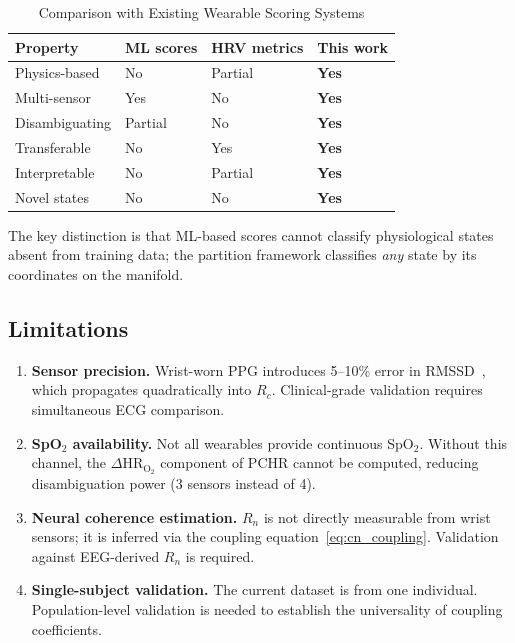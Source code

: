 \documentclass[10pt,twocolumn,a4paper]{article}
\theoremstyle{definition}
\newcommand{\Rc}{R_c}
\newcommand{\Rn}{R_n}
\begin{document}
\begin{table}[H]
\centering
\caption{Comparison with Existing Wearable Scoring Systems}
\label{tab:comparison}
\begin{tabular}{llll}
\toprule
\textbf{Property} & \textbf{ML scores} & \textbf{HRV metrics} & \textbf{This work}\\
\midrule
Physics-based & No & Partial & \textbf{Yes}\\
Multi-sensor & Yes & No & \textbf{Yes}\\
Disambiguating & Partial & No & \textbf{Yes}\\
Transferable & No & Yes & \textbf{Yes}\\
Interpretable & No & Partial & \textbf{Yes}\\
Novel states & No & No & \textbf{Yes}\\
\bottomrule
\end{tabular}
\end{table}

The key distinction is that ML-based scores cannot classify physiological
states absent from training data; the partition framework classifies
\emph{any} state by its coordinates on the manifold.

\subsection{Limitations}

\begin{enumerate}[nosep]
\item \textbf{Sensor precision.} Wrist-worn PPG introduces 5--10\%
  error in RMSSD~\cite{derosario2019validity}, which propagates
  quadratically into $\Rc$. Clinical-grade validation requires
  simultaneous ECG comparison.
\item \textbf{SpO$_2$ availability.} Not all wearables provide
  continuous SpO$_2$. Without this channel, the
  $\Delta\text{HR}_{\text{O}_2}$ component of PCHR cannot be computed,
  reducing disambiguation power (3 sensors instead of 4).
\item \textbf{Neural coherence estimation.} $\Rn$ is not directly
  measurable from wrist sensors; it is inferred via the coupling
  equation~\eqref{eq:cn_coupling}. Validation against EEG-derived
  $\Rn$ is required.
\item \textbf{Single-subject validation.} The current dataset is from
  one individual. Population-level validation is needed to establish
  the universality of coupling coefficients.
\end{enumerate}
\end{document}
